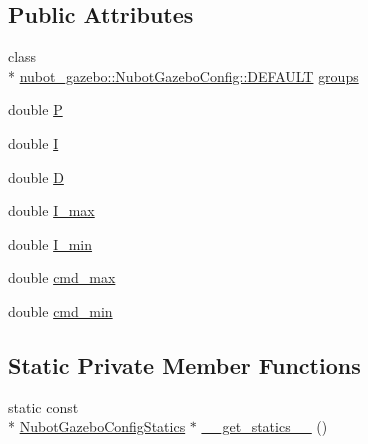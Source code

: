 \subsection*{Public Attributes}
\begin{DoxyCompactItemize}
\item 
class \\*
\hyperlink{classnubot__gazebo_1_1NubotGazeboConfig_1_1DEFAULT}{nubot\-\_\-gazebo\-::\-Nubot\-Gazebo\-Config\-::\-D\-E\-F\-A\-U\-L\-T} \hyperlink{classnubot__gazebo_1_1NubotGazeboConfig_ad1f0e71f297397fbc7994b61f9785da5}{groups}
\item 
double \hyperlink{classnubot__gazebo_1_1NubotGazeboConfig_a50e7782963d3dd521964548e742b8c63}{P}
\item 
double \hyperlink{classnubot__gazebo_1_1NubotGazeboConfig_a930fff77f67ebef1cdc9f449295d3ddf}{I}
\item 
double \hyperlink{classnubot__gazebo_1_1NubotGazeboConfig_a36f58a1ec4be38b11b4b99199d0307ec}{D}
\item 
double \hyperlink{classnubot__gazebo_1_1NubotGazeboConfig_a11ef5361bdd4230a0ba0c53a05c379f5}{I\-\_\-max}
\item 
double \hyperlink{classnubot__gazebo_1_1NubotGazeboConfig_ad84e3e678499076a694352cba73a2600}{I\-\_\-min}
\item 
double \hyperlink{classnubot__gazebo_1_1NubotGazeboConfig_ae404cdb1d76241bad987ba2adbe1efaf}{cmd\-\_\-max}
\item 
double \hyperlink{classnubot__gazebo_1_1NubotGazeboConfig_a504301edbc6ea775d8d4512a9e88dc78}{cmd\-\_\-min}
\end{DoxyCompactItemize}
\subsection*{Static Private Member Functions}
\begin{DoxyCompactItemize}
\item 
static const \\*
\hyperlink{classnubot__gazebo_1_1NubotGazeboConfigStatics}{Nubot\-Gazebo\-Config\-Statics} $\ast$ \hyperlink{classnubot__gazebo_1_1NubotGazeboConfig_a97a452c2e41798f6f6384c940e199b8e}{\-\_\-\-\_\-get\-\_\-statics\-\_\-\-\_\-} ()
\end{DoxyCompactItemize}


